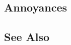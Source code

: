%
%
%
%

\subsection[Annoyances]{Annoyances}\label{annoyances}

\hspace{\fill}

\subsection[See Also]{See Also}\label{see-also}

